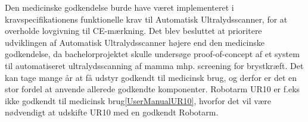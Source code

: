 Den medicinske godkendelse burde have været implementeret i kravspecifikationens funktionelle krav til Automatisk Ultralydsscanner, for at overholde lovgivning til CE-mærkning. Det blev besluttet at prioritere udviklingen af Automatisk Ultralydsscanner højere end den medicinske godkendelse, da bachelorprojektet skulle undersøge proof-of-concept af et system til automatiseret ultralydsscanning af mamma mhp. screening for brystkræft. Det kan tage mange år at få udstyr godkendt til medicinsk brug, og derfor er det en stor fordel at anvende allerede godkendte komponenter. Robotarm UR10 er f.eks ikke godkendt til medicinsk brug\ref{UserManualUR10}, hvorfor det vil være nødvendigt at udskifte UR10 med en godkendt Robotarm. 


 
